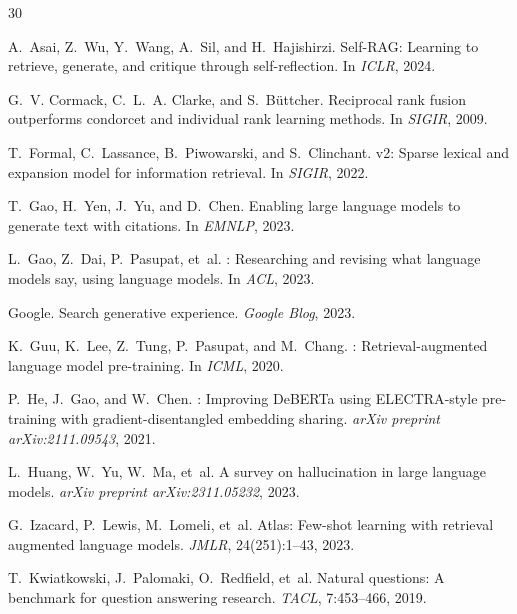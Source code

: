 \documentclass[11pt,twocolumn]{article}
\begin{document}

\begin{thebibliography}{30}

A.~Asai, Z.~Wu, Y.~Wang, A.~Sil, and H.~Hajishirzi.
\newblock Self-{RAG}: Learning to retrieve, generate, and critique through self-reflection.
\newblock In \emph{ICLR}, 2024.

G.~V. Cormack, C.~L.~A. Clarke, and S.~B\"uttcher.
\newblock Reciprocal rank fusion outperforms condorcet and individual rank learning methods.
\newblock In \emph{SIGIR}, 2009.

T.~Formal, C.~Lassance, B.~Piwowarski, and S.~Clinchant.
 v2: Sparse lexical and expansion model for information retrieval.
\newblock In \emph{SIGIR}, 2022.

T.~Gao, H.~Yen, J.~Yu, and D.~Chen.
\newblock Enabling large language models to generate text with citations.
\newblock In \emph{EMNLP}, 2023.

L.~Gao, Z.~Dai, P.~Pasupat, et~al.
: Researching and revising what language models say, using language models.
\newblock In \emph{ACL}, 2023.

Google.
\newblock Search generative experience.
\newblock \emph{Google Blog}, 2023.

K.~Guu, K.~Lee, Z.~Tung, P.~Pasupat, and M.~Chang.
: Retrieval-augmented language model pre-training.
\newblock In \emph{ICML}, 2020.

P.~He, J.~Gao, and W.~Chen.
: Improving {DeBERTa} using {ELECTRA}-style pre-training with gradient-disentangled embedding sharing.
\newblock \emph{arXiv preprint arXiv:2111.09543}, 2021.

L.~Huang, W.~Yu, W.~Ma, et~al.
\newblock A survey on hallucination in large language models.
\newblock \emph{arXiv preprint arXiv:2311.05232}, 2023.

G.~Izacard, P.~Lewis, M.~Lomeli, et~al.
\newblock Atlas: Few-shot learning with retrieval augmented language models.
\newblock \emph{JMLR}, 24(251):1--43, 2023.

T.~Kwiatkowski, J.~Palomaki, O.~Redfield, et~al.
\newblock Natural questions: A benchmark for question answering research.
\newblock \emph{TACL}, 7:453--466, 2019.


\end{thebibliography}
\end{document}
